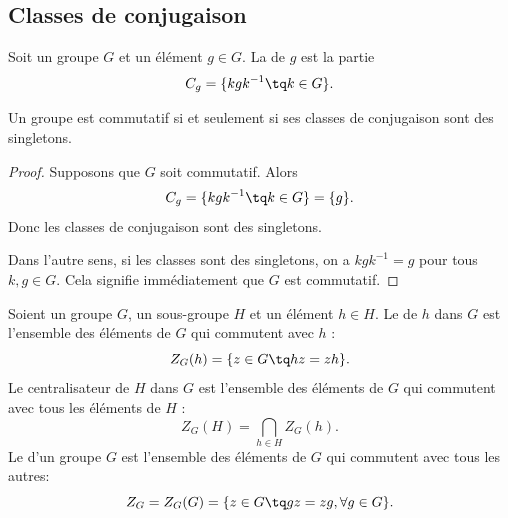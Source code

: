 \subsection{Classes de conjugaison}

\begin{definition}       \label{DEFooOLXPooWelsZV}
	Soit un groupe \( G\) et un élément \( g\in G\). La  de \( g\) est la partie
	\begin{equation}
		C_g=\{ kgk^{-1}\tq k\in G \}.
	\end{equation}
\end{definition}

\begin{lemma}       \label{LEMooQYBJooYwMwGM}
	Un groupe est commutatif si et seulement si ses classes de conjugaison sont des singletons.
\end{lemma}

\begin{proof}
	Supposons que \( G\) soit commutatif. Alors
	\begin{equation}
		C_g=\{ kgk^{-1}\tq k\in G \}=\{ g \}.
	\end{equation}
	Donc les classes de conjugaison sont des singletons.

	Dans l'autre sens, si les classes sont des singletons, on a \( kgk^{-1}=g\) pour tous \( k,g\in G\). Cela signifie immédiatement que \( G\) est commutatif.
\end{proof}

\begin{definition}         \label{defGroupeCentre}
	Soient un groupe \( G\), un sous-groupe \( H\) et un élément \( h\in H\). Le  de \( h\) dans \( G\) est l'ensemble des éléments de \( G\) qui commutent avec \( h\) :
	\begin{equation}
		Z_G(h)=\{z\in G\tq hz=zh\}.
	\end{equation}
	Le centralisateur de \( H\) dans \( G\) est l'ensemble des éléments de \( G\) qui commutent avec tous les éléments de \( H\) :
	\begin{equation}
		Z_G(H)=\bigcap_{h\in H}Z_G(h).
	\end{equation}
	Le  d'un groupe \( G\) est l'ensemble des éléments de \( G\) qui commutent avec tous les autres:
	\begin{equation}
		Z_G=Z_G(G)=\{ z\in G\tq gz=zg , \forall g\in G \}.
	\end{equation}
\end{definition}

